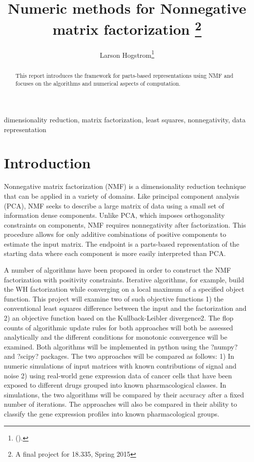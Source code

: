 \documentclass[final,leqno,onefignum,onetabnum]{siamltex1213}
\title{Numeric methods for Nonnegative matrix factorization \thanks{A final project for 18.335, Spring 2015}}
\author{Larson Hogstrom\thanks{
(\email{hogstrom@mit.edu}). }}
\begin{document}
\maketitle
{}%

\begin{abstract}
This report introduces the framework for parts-based representations using NMF and focuses on the algorithms and numerical aspects of computation. 

\end{abstract}

\begin{keywords} dimensionality reduction, matrix factorization, least squares, nonnegativity, data representation \end{keywords}



\pagestyle{myheadings}
\thispagestyle{plain}

\section{Introduction}

Nonnegative matrix factorization (NMF) is a dimensionality reduction technique that can be applied in a variety of domains. Like principal component analysis (PCA), NMF seeks to describe a large matrix of data using a small set of information dense components. Unlike PCA, which imposes orthogonality constraints on components, NMF requires nonnegativity after factorization. This procedure allows for only additive combinations of positive components to estimate the input matrix. The endpoint is a parts-based representation of the starting data where each component is more easily interpreted than PCA. 

A number of algorithms have been proposed in order to construct the NMF factorization with positivity constraints. Iterative algorithms, for example, build the WH factorization while converging on a local maximum of a specified object function. This project will examine two of such objective functions 1) the conventional least squares difference between the input and the factorization and 2) an objective function based on the Kullback-Leibler divergence2. The flop counts of algorithmic update rules for both approaches will both be assessed analytically and the different conditions for monotonic convergence will be examined. Both algorithms will be implemented in python using the ?numpy? and ?scipy? packages. The two approaches will be compared as follows: 1) In numeric simulations of input matrices with known contributions of signal and noise 2) using real-world gene expression data of cancer cells that have been exposed to different drugs grouped into known pharmacological classes. In simulations, the two algorithms will be compared by their accuracy after a fixed number of iterations. The approaches will also be compared in their ability to classify the gene expression profiles into known pharmacological groups.
\end{document}
